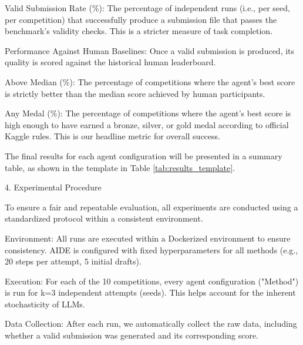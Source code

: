 Valid Submission Rate (\%): The percentage of independent runs (i.e., per seed, per competition) that successfully produce a submission file that passes the benchmark's validity checks. This is a stricter measure of task completion.

Performance Against Human Baselines: Once a valid submission is produced, its quality is scored against the historical human leaderboard.

Above Median (\%): The percentage of competitions where the agent's best score is strictly better than the median score achieved by human participants.

Any Medal (\%): The percentage of competitions where the agent's best score is high enough to have earned a bronze, silver, or gold medal according to official Kaggle rules. This is our headline metric for overall success.

The final results for each agent configuration will be presented in a summary table, as shown in the template in Table \ref{tab:results_template}.


4. Experimental Procedure

To ensure a fair and repeatable evaluation, all experiments are conducted using a standardized protocol within a consistent environment.

Environment: All runs are executed within a Dockerized environment to ensure consistency. AIDE is configured with fixed hyperparameters for all methods (e.g., 20 steps per attempt, 5 initial drafts).

Execution: For each of the 10 competitions, every agent configuration ("Method") is run for k=3 independent attempts (seeds). This helps account for the inherent stochasticity of LLMs.

Data Collection: After each run, we automatically collect the raw data, including whether a valid submission was generated and its corresponding score.


